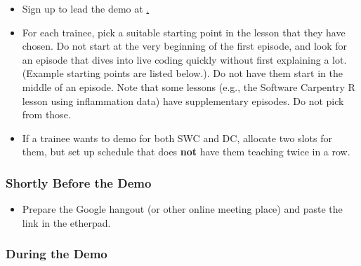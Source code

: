 \begin{itemize}
\item
  Sign up to lead the demo at
  \href{http://pad.software-carpentry.org/teaching-demos}.
\item
  For each trainee, pick a suitable starting point in the lesson that
  they have chosen. Do not start at the very beginning of the first
  episode, and look for an episode that dives into live coding quickly
  without first explaining a lot. (Example starting points are listed
  below.). Do not have them start in the middle of an episode. Note that
  some lessons (e.g., the Software Carpentry R lesson using inflammation
  data) have supplementary episodes. Do not pick from those.
\item
  If a trainee wants to demo for both SWC and DC, allocate two slots for
  them, but set up schedule that does \textbf{not} have them teaching
  twice in a row.
\end{itemize}

\subsubsection{Shortly Before the Demo}\label{shortly-before-the-demo}

\begin{itemize}
\item
  Prepare the Google hangout (or other online meeting place) and paste
  the link in the etherpad.
\end{itemize}

\subsubsection{During the Demo}\label{during-the-demo}

